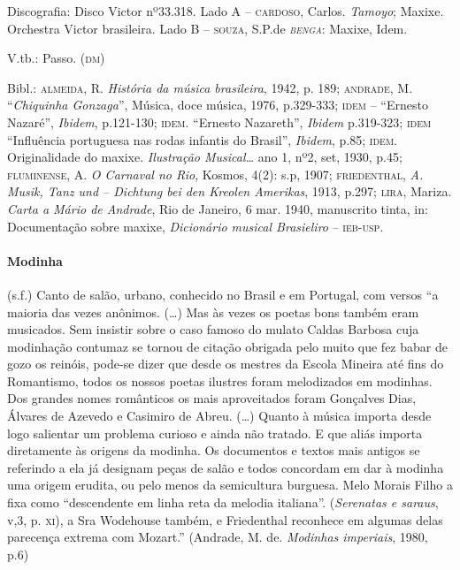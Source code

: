 Discografia: Disco Victor nº33.318. Lado A -- \textsc{cardoso}, Carlos.
\emph{Tamoyo}; Maxixe. Orchestra Victor brasileira. Lado B -- \textsc{souza},
S.P.de \emph{\textsc{benga}}: Maxixe, Idem.

V.tb.: Passo. (\textsc{dm})

Bibl.: \textsc{almeida}, R. \emph{História da música brasileira}, 1942, p. 189;
\textsc{andrade}, M. ``\emph{Chiquinha Gonzaga}'', Música, doce música, 1976,
p.329-333; \textsc{idem} -- ``Ernesto Nazaré'', \emph{Ibidem}, p.121-130; \textsc{idem}.
``Ernesto Nazareth'', \emph{Ibidem} p.319-323; \textsc{idem} ``Influência portuguesa
nas rodas infantis do Brasil'', \emph{Ibidem}, p.85; \textsc{idem}. Originalidade
do maxixe. \emph{Ilustração Musical\ldots{}} ano 1, nº2, set, 1930, p.45;
\textsc{fluminense}, A. \emph{O Carnaval no Rio}, Kosmos, 4(2): s.p, 1907;
\textsc{friedenthal}, \emph{A. Musik, Tanz und -- Dichtung bei den Kreolen
Amerikas}, 1913, p.297; \textsc{lira}, Mariza. \emph{Carta a Mário de Andrade},
Rio de Janeiro, 6 mar. 1940, manuscrito tinta, in: Documentação sobre
maxixe, \emph{Dicionário musical Brasieliro} -- \textsc{ieb-usp}.

\paragraph{Modinha} (s.f.) Canto de salão, urbano, conhecido no Brasil e
em Portugal, com versos ``a maioria das vezes anônimos. (\ldots{}) Mas às
vezes os poetas bons também eram musicados. Sem insistir sobre o caso
famoso do mulato Caldas Barbosa cuja modinhação contumaz se tornou de
citação obrigada pelo muito que fez babar de gozo os reinóis, pode-se
dizer que desde os mestres da Escola Mineira até fins do Romantismo,
todos os nossos poetas ilustres foram melodizados em modinhas. Dos
grandes nomes românticos os mais aproveitados foram Gonçalves Dias,
Álvares de Azevedo e Casimiro de Abreu. (\ldots{}) Quanto à música importa
desde logo salientar um problema curioso e ainda não tratado. E que
aliás importa diretamente às origens da modinha. Os documentos e textos
mais antigos se referindo a ela já designam peças de salão e todos
concordam em dar à modinha uma origem erudita, ou pelo menos da
semicultura burguesa. Melo Morais Filho a fixa como ``descendente em
linha reta da melodia italiana''. (\emph{Serenatas e saraus}, v,3, p.
\textsc{xi}), a Sra Wodehouse também, e Friedenthal reconhece em algumas delas
parecença extrema com Mozart.'' (Andrade, M. de. \emph{Modinhas
imperiais}, 1980, p.6)

